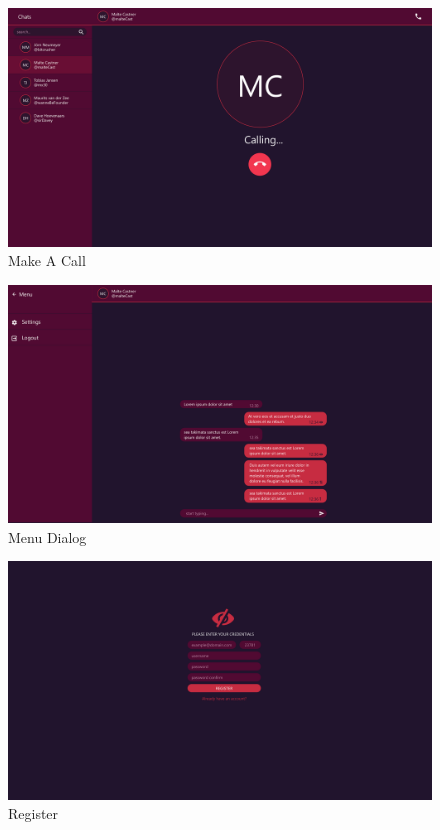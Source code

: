 \begin{figure}[h]
    \centering
    \includegraphics[width=1.0\textwidth]{./graphics/wireframes/MakeACall}
    \caption{Make A Call}
    \label{fig:figure24}
\end{figure}

\begin{figure}[h]
    \centering
    \includegraphics[width=1.0\textwidth]{./graphics/wireframes/MenuDialog}
    \caption{Menu Dialog}
    \label{fig:figure25}
\end{figure}

\begin{figure}[h]
    \centering
    \includegraphics[width=1.0\textwidth]{./graphics/wireframes/Register}
    \caption{Register}
    \label{fig:figure26}
\end{figure}

